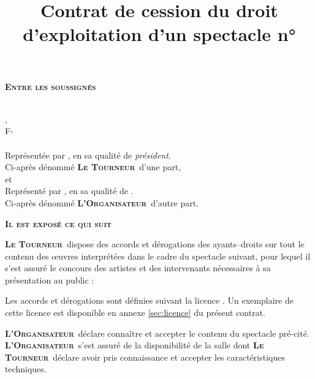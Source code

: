 \documentclass[a4paper,10pt]{article}
\title{Contrat de cession du droit d'exploitation d'un spectacle n°\NUMBERCONTRAT{}}
\author{\AMMDlong}
\newcommand{\PR}{\textbf{\textsc{Le Tourneur}}}
\newcommand{\OR}{\textbf{\textsc{L'Organisateur}}}
\begin{document}
\maketitle
\thispagestyle{fancy}

{
  \noindent\large\textbf{\textsc{Entre les soussign\'es}}
\vspace{0.3cm}
}

\noindent\emph{\AMMDlong{}}\\
\ADRAMMD{},\\
F-\CPAMMD{} \VILLEAMMD{}\\
\emph{\TELAMMD{}}\\
Repr\'esent\'ee par \emph{\PRESIDENTAMMD}, en sa qualit\'e de \emph{pr\'esident\HorF{}}.\\
Ci-apr\`es d\'enomm\'e \PR\ d'une part,\\

et\\

\noindent\RAISONSOCIALE{}\newline
\ADRESSE{}\newline
\TELEPHONE{}\newline
\SIRET{}\newline
\ENTREPRENEUR{}
\hfill \CAT{}\newline
\noindent Repr\'esent\'e par \emph{\REPRESENTANT{}}, en sa qualit\'e de \emph{\QUALITE{}}.\\
Ci-apr\`es d\'enomm\'e \OR\ d'autre part.\\
\vspace{.5cm}
\begin{center}
  \large
  \textbf{\textsc{Il est expos\'e ce qui suit}}
\end{center}

\PR\ dispose des accords et d\'erogations des ayants--droits
\emph{\PAYS{}} sur tout le contenu des \oe uvres interpr\'et\'ees dans
le cadre du spectacle suivant, pour lequel il s'est assur\'e le concours
des artistes et des intervenants n\'ecessaires \`a sa pr\'esentation au public :
\begin{center}
  \textbf{\textsc{\NOMSPECTACLE{}}}
\end{center}
Les accords et d\'erogations sont d\'efinies suivant la licence
\emph{\LICENCETYPE{}}. Un exemplaire de cette licence est disponible en
annexe \ref{sec:licence} du pr\'esent contrat.

\OR\ d\'eclare conna\^itre et accepter le contenu du spectacle pr\'e-cit\'e.
\OR\ s'est assur\'e de la disponibilit\'e de la salle
\emph{\NOMADRSALLE{}} dont \PR\ d\'eclare avoir pris connaissance et
accepter les caract\'eristiques techniques.
\end{document}
